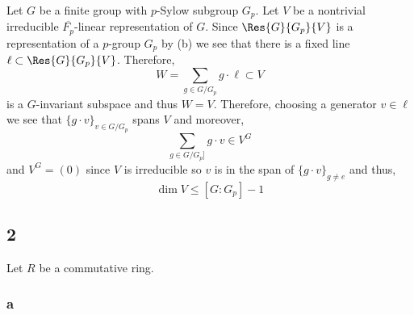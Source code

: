 \documentclass[12pt]{article}
\begin{document}
Let $G$ be a finite group with $p$-Sylow subgroup $G_p$. Let $V$ be a nontrivial irreducible $\overline{F_p}$-linear representation of $G$. Since $\Res{G}{G_p}{V}$ is a representation of a $p$-group $G_p$ by (b) we see that there is a fixed line $\ell \subset \Res{G}{G_p}{V}$. Therefore, 
\[ W = \sum_{g \in G / G_p} g \cdot \ell \subset V \]
is a $G$-invariant subspace and thus $W = V$. Therefore, choosing a generator $v \in \ell$ we see that $\{ g \cdot v \}_{v \in G / G_p}$ spans $V$ and moreover,
\[ \sum_{g \in G / G_p]} g \cdot v \in V^G \]
and $V^G = (0)$ since $V$ is irreducible so $v$ is in the span of $\{ g \cdot v \}_{g \neq e}$ and thus,
\[ \dim{V} \le [G : G_p] - 1 \]

\subsection{2}

Let $R$ be a commutative ring.

\subsubsection{a}
\end{document}
